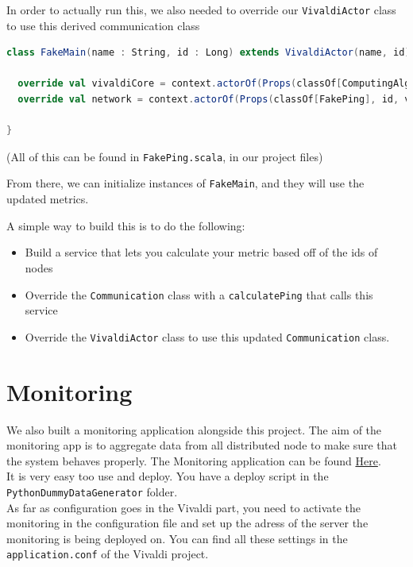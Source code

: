 \documentclass[11pt,a4paper]{article}
\begin{document}
In order to actually run this, we also needed to override our \verb|VivaldiActor| class to use this derived communication class

\begin{lstlisting}[language=scala]
class FakeMain(name : String, id : Long) extends VivaldiActor(name, id) {

  override val vivaldiCore = context.actorOf(Props(classOf[ComputingAlgorithm], self, deltaConf), "VivaldiCore"+id)
  override val network = context.actorOf(Props(classOf[FakePing], id, vivaldiCore, self), "Network"+id)

}
\end{lstlisting}

(All of this can be found in \verb|FakePing.scala|, in our project files)

From there, we can initialize instances of \verb|FakeMain|, and they will use the updated metrics.

A simple way to build this is to do the following: 
\begin{itemize}
\item Build a service that lets you calculate your metric based off of the ids of nodes 
\item Override the \verb|Communication| class with a \verb|calculatePing| that calls this service
\item Override the \verb|VivaldiActor| class to use this updated \verb|Communication| class.
\end{itemize}

\section{Monitoring}
We also built a monitoring application alongside this project. The aim of the monitoring app is to aggregate data from all distributed node to make sure that the system behaves properly. The Monitoring application can be found \href{https://github.com/callicles/VivaldiMonitoringPlay}{Here}.\\

It is very easy too use and deploy. You have a deploy script in the  \texttt{PythonDummyDataGenerator} folder.\\

As far as configuration goes in the Vivaldi part, you need to activate the monitoring in the configuration file and set up the adress of the server the monitoring is being deployed on. You can find all these settings in the \texttt{application.conf} of the Vivaldi project.\\
\end{document}
